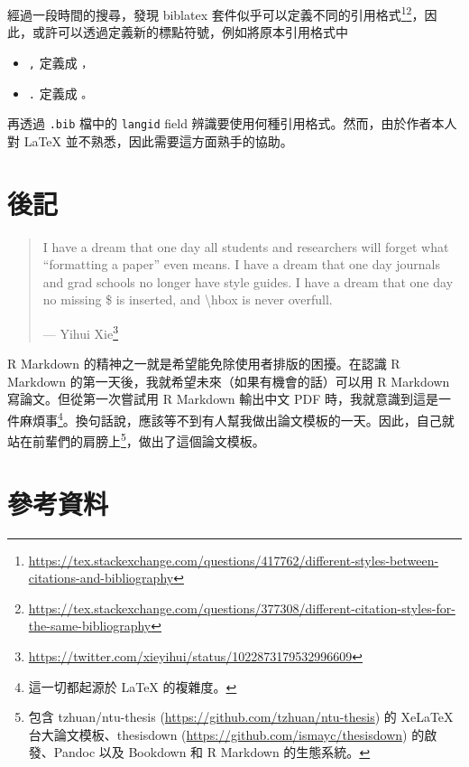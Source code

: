 \documentclass[oneside]{book}
\let\oldhref=\href
\renewcommand{\href}[2]{#2\footnote{\url{#1}}}
\providecommand{\tightlist}{%
  \setlength{\itemsep}{0pt}\setlength{\parskip}{0pt}}
\theoremstyle{definition}
\theoremstyle{definition}
\theoremstyle{definition}
\theoremstyle{remark}
\begin{document}
經過一段時間的搜尋，發現 biblatex 套件似乎可以定義不同的引用格式\footnote{\url{https://tex.stackexchange.com/questions/417762/different-styles-between-citations-and-bibliography}}\footnote{\url{https://tex.stackexchange.com/questions/377308/different-citation-styles-for-the-same-bibliography}}，因此，或許可以透過定義新的標點符號，例如將原本引用格式中

\begin{itemize}
\tightlist
\item
  \texttt{,} 定義成 \texttt{，}
\item
  \texttt{.} 定義成 \texttt{。}
\end{itemize}

再透過 \texttt{.bib} 檔中的 \texttt{langid} field 辨識要使用何種引用格式。然而，由於作者本人對 LaTeX 並不熟悉，因此需要這方面熟手的協助。

\hypertarget{epilogue}{%
\chapter{後記}\label{epilogue}}

\begin{quote}
I have a dream that one day all students and researchers will forget what ``formatting a paper'' even means. I have a dream that one day journals and grad schools no longer have style guides. I have a dream that one day no missing \$ is inserted, and \textbackslash{}hbox is never overfull.

\hspace*{\fill}

--- \href{https://twitter.com/xieyihui/status/1022873179532996609}{Yihui Xie}
\end{quote}

R Markdown 的精神之一就是希望能免除使用者排版的困擾。在認識 R Markdown 的第一天後，我就希望未來（如果有機會的話）可以用 R Markdown 寫論文。但從第一次嘗試用 R Markdown 輸出中文 PDF 時，我就意識到這是一件麻煩事\footnote{這一切都起源於 LaTeX 的複雜度。}。換句話說，應該等不到有人幫我做出論文模板的一天。因此，自己就站在前輩們的肩膀上\footnote{包含 tzhuan/ntu-thesis (\url{https://github.com/tzhuan/ntu-thesis}) 的 XeLaTeX 台大論文模板、thesisdown (\url{https://github.com/ismayc/thesisdown}) 的啟發、Pandoc 以及 Bookdown 和 R Markdown 的生態系統。}，做出了這個論文模板。

\renewcommand{\href}{\oldhref}

\hypertarget{references}{%
\chapter*{參考資料}\label{references}}
\end{document}
